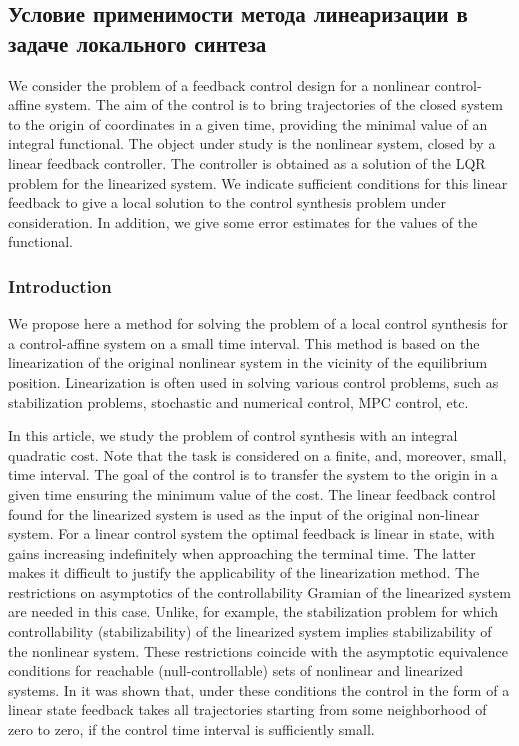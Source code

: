 \documentclass[../main.tex]{subfiles}
\begin{document}
\subsection{Условие применимости метода линеаризации в задаче локального синтеза} 
We consider the problem of a feedback control design for a nonlinear control-affine system. The aim of the control is to bring  trajectories of the closed system to the origin of coordinates in a given time, providing the minimal value of an integral functional. The object under study is the nonlinear system, closed by a linear feedback controller. The controller is  obtained as a solution of the LQR problem for the linearized system. We indicate sufficient conditions  for this linear feedback to give a local solution to the control synthesis problem under consideration.  In addition, we give some  error estimates for the values of the functional. 

\subsubsection{Introduction}

We propose here a method for solving the problem of a local control synthesis  for a control-affine system on a small time interval. This method is based  on the linearization of the original nonlinear system in the vicinity  of the equilibrium position.  Linearization is often used in solving various control problems, such as stabilization problems\cite{Kras_add,Khalil}, stochastic and numerical control\cite{Roxin,EKF,denBerg,Pang}, MPC control\cite{Murillo,LTV_MPC}, etc.

In this article, we study the problem of control synthesis with an integral quadratic cost. Note that the task is considered on a finite, and, moreover, small, time interval. The goal of the control is to transfer the system to the origin in a given time ensuring the minimum value of the cost. The linear feedback control found for the linearized system is used as  the input of the original non-linear system. For a linear control system the optimal feedback is linear in state, with gains increasing indefinitely when approaching the terminal time. The latter  makes it difficult to justify the applicability of the linearization method. The restrictions on  asymptotics  of the controllability Gramian of the linearized system are needed in this case. Unlike, for example, the stabilization problem for which controllability (stabilizability) of the linearized system implies stabilizability of the nonlinear system. These restrictions coincide with the  asymptotic equivalence conditions for reachable  (null-controllable) sets of nonlinear and linearized systems. In \cite{GusevOsipov} it was shown that, under these conditions the control in the form of a linear state feedback takes all trajectories starting from some neighborhood of zero to zero, if the control time interval is sufficiently small. 
\end{document}
